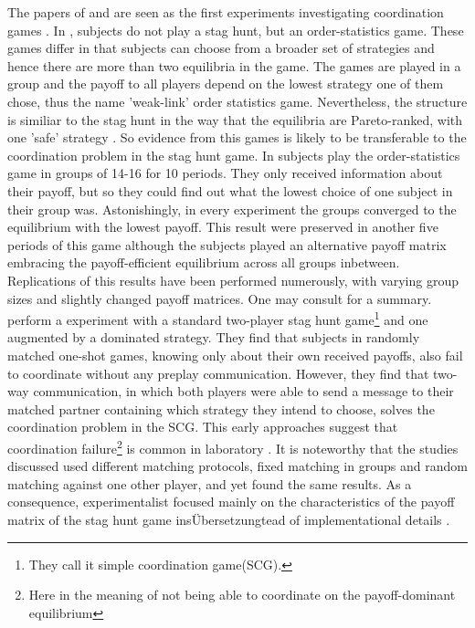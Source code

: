 \documentclass[11pt]{article}
\begin{document}
The papers of \textcite{van_huyck_tacit_1990} and 
\textcite{cooper_communication_1992} are seen as the first experiments 
investigating coordination games \parencite{devetag_when_2007}.
In \textcite{van_huyck_tacit_1990}, subjects do not play a stag
hunt, but an order-statistics game. These games differ in that subjects can
choose from a broader set of strategies and hence there are more than two 
equilibria in the game. The games are played in a group and the payoff to 
all players depend on the lowest strategy one of them chose, thus the name 
'weak-link' order statistics game. Nevertheless, the structure is similiar to 
the stag hunt in the way that the equilibria are Pareto-ranked, with one 
'safe' strategy \parencite{devetag_when_2007}. So evidence from this games is 
likely to be transferable to the coordination problem in the stag hunt game. 
In  \cite{van_huyck_tacit_1990} subjects play the order-statistics game in 
groups of 14-16 for 10 periods. They only received information about their 
payoff, but so they could find out what the lowest choice of one subject in 
their group was. Astonishingly, in every experiment the groups converged
to the equilibrium with the lowest payoff. This result were preserved in another 
five periods of this game although the subjects played an alternative payoff
matrix embracing the payoff-efficient equilibrium across all groups inbetween. 
Replications of this results have been performed numerously, with varying group
sizes and slightly changed payoff matrices. 
One may consult \textcite{devetag_when_2007} for a summary. 
\textcite{cooper_communication_1992} perform a experiment with a standard 
two-player stag hunt game\footnote{They call it simple coordination game(SCG).} 
and one augmented by a dominated strategy. They find that 
subjects in randomly matched one-shot games, knowing only about their own
received payoffs, also fail to coordinate without any preplay communication. 
However, they find that two-way communication, in which both players were
able to send a message to their matched partner containing which strategy
they intend to choose, solves the coordination problem in the SCG. 
This early approaches suggest that coordination failure\footnote{Here in the 
meaning of not being able to coordinate on the payoff-dominant equilibrium} is
common in laboratory \parencite{devetag_when_2007}. It is noteworthy that the studies 
discussed used different matching protocols, fixed matching in groups and 
random matching against one other player, and yet found the same results. 
As a consequence, experimentalist focused mainly on the characteristics of the
payoff matrix of the stag hunt game insÜbersetzungtead of implementational details
\parencite{devetag_when_2007}.
\end{document}
